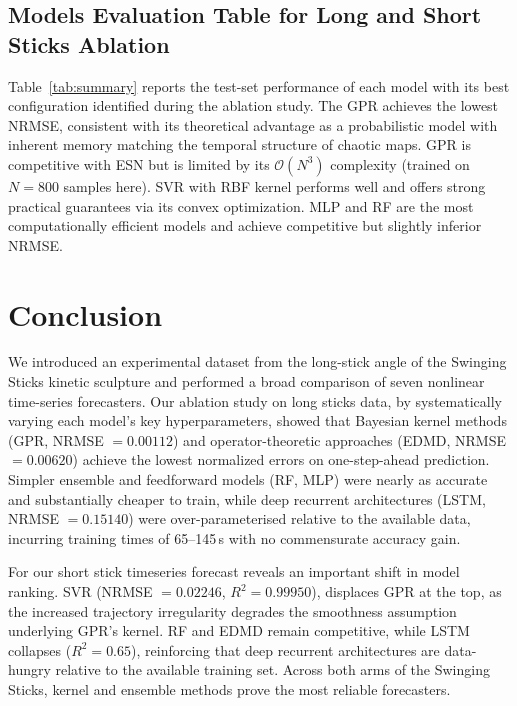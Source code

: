 \documentclass[letterpaper, 10pt, conference]{IEEEtran}
\begin{document}
        
        
        \subsection{Models Evaluation Table for Long and Short Sticks Ablation}
        Table~\ref{tab:summary} reports the test-set performance of each model
        with its best configuration identified during the ablation study.
        The GPR achieves the lowest NRMSE, consistent with its theoretical advantage
        as a probabilistic model with inherent memory matching the temporal structure
        of chaotic maps. GPR is competitive with ESN but is limited by its
        $\mathcal{O}(N^3)$ complexity (trained on $N=800$ samples here). SVR with
        RBF kernel performs well and offers strong practical guarantees via its
        convex optimization. MLP and RF are the most computationally efficient models
        and achieve competitive but slightly inferior NRMSE.
            

    \section{Conclusion}
        \label{sec:conclusion}


        We introduced an experimental dataset from the long-stick angle of the Swinging Sticks kinetic sculpture and performed a broad comparison of seven nonlinear time-series forecasters. Our ablation study on long sticks data, by systematically varying each model's key hyperparameters, showed that Bayesian kernel methods (GPR, NRMSE $= 0.00112$) and operator-theoretic
        approaches (EDMD, NRMSE $= 0.00620$) achieve the lowest normalized errors on one-step-ahead prediction. Simpler ensemble and feedforward models (RF, MLP) were nearly as accurate and substantially cheaper to train, while deep recurrent architectures (LSTM, NRMSE $= 0.15140$) were over-parameterised relative to the available data, incurring training times of 65--145\,s with no commensurate accuracy gain.

        For our short stick timeseries  forecast reveals an important shift in model ranking. SVR (NRMSE $= 0.02246$, $R^2 = 0.99950$), displaces GPR at the top, as the increased trajectory irregularity degrades the smoothness assumption underlying GPR's kernel. RF and EDMD remain competitive, while LSTM collapses ($R^2 = 0.65$), reinforcing that deep recurrent architectures are data-hungry relative to the available training set. Across both arms of the Swinging Sticks, kernel and ensemble methods prove the most reliable forecasters.
        
\end{document}
